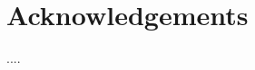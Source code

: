 \documentclass[preprint,prl,twocolumn]{revtex4}
\begin{document}
\section*{Acknowledgements}

....

%
%
%




\begin{thebibliography}{27}






\end{thebibliography}
\end{document}
